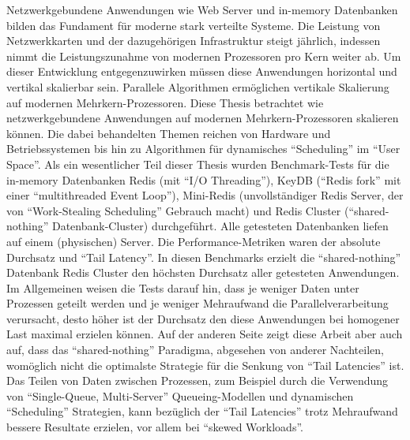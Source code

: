 Netzwerkgebundene Anwendungen wie Web Server und in-memory Datenbanken bilden das Fundament für moderne stark verteilte Systeme. Die Leistung von Netzwerkkarten und der dazugehörigen Infrastruktur steigt jährlich, indessen nimmt die Leistungszunahme von \linebreak modernen Prozessoren pro Kern weiter ab. Um dieser Entwicklung entgegenzuwirken müssen diese Anwendungen horizontal und vertikal skalierbar sein. Parallele Algorithmen ermöglichen vertikale Skalierung auf modernen Mehrkern-Prozessoren. Diese Thesis betrachtet wie \linebreak netzwerkgebundene Anwendungen auf modernen Mehrkern-Prozessoren skalieren können. Die dabei behandelten Themen reichen von Hardware und Betriebssystemen bis hin zu \linebreak Algorithmen für dynamisches “Scheduling” im “User Space”.\newline
Als ein wesentlicher Teil dieser Thesis wurden Benchmark-Tests für die in-memory Datenbanken Redis (mit  “I/O Threading”), KeyDB (“Redis fork” mit einer “multithreaded Event Loop”), Mini-Redis (unvollständiger Redis Server, der von “Work-Stealing Scheduling” \linebreak Gebrauch macht) und Redis Cluster (“shared-nothing” Datenbank-Cluster) durchgeführt. Alle getesteten Datenbanken liefen auf einem (physischen) Server. Die Performance-Metriken waren der absolute Durchsatz und “Tail Latency”. In diesen Benchmarks erzielt die “shared-nothing” Datenbank Redis Cluster den höchsten Durchsatz aller getesteten Anwendungen. Im Allgemeinen weisen die Tests darauf hin, dass je weniger Daten unter Prozessen geteilt werden und je weniger Mehraufwand die Parallelverarbeitung verursacht, desto höher ist der Durchsatz den diese Anwendungen bei homogener Last maximal erzielen können. Auf der anderen Seite zeigt diese Arbeit aber auch auf, dass das “shared-nothing” Paradigma, abgesehen von anderer Nachteilen, womöglich nicht die optimalste Strategie für die Senkung von “Tail Latencies” ist. 
Das Teilen von Daten zwischen Prozessen, zum Beispiel durch die Verwendung von “Single-Queue, Multi-Server” Queueing-Modellen und dynamischen “Scheduling” Strategien, kann bezüglich der “Tail Latencies” trotz Mehraufwand bessere Resultate erzielen, vor allem bei “skewed Workloads”.
